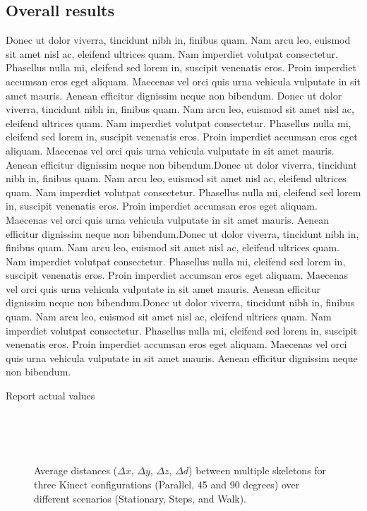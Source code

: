 \documentclass{sigchi}
\begin{document}
\subsection{Overall results}

Donec ut dolor viverra, tincidunt nibh in, finibus quam. Nam arcu leo, euismod sit amet nisl ac, eleifend ultrices quam. Nam imperdiet volutpat consectetur. Phasellus nulla mi, eleifend sed lorem in, suscipit venenatis eros. Proin imperdiet accumsan eros eget aliquam. Maecenas vel orci quis urna vehicula vulputate in sit amet mauris. Aenean efficitur dignissim neque non bibendum.
Donec ut dolor viverra, tincidunt nibh in, finibus quam. Nam arcu leo, euismod sit amet nisl ac, eleifend ultrices quam. Nam imperdiet volutpat consectetur. Phasellus nulla mi, eleifend sed lorem in, suscipit venenatis eros. Proin imperdiet accumsan eros eget aliquam. Maecenas vel orci quis urna vehicula vulputate in sit amet mauris. Aenean efficitur dignissim neque non bibendum.Donec ut dolor viverra, tincidunt nibh in, finibus quam. Nam arcu leo, euismod sit amet nisl ac, eleifend ultrices quam. Nam imperdiet volutpat consectetur. Phasellus nulla mi, eleifend sed lorem in, suscipit venenatis eros. Proin imperdiet accumsan eros eget aliquam. Maecenas vel orci quis urna vehicula vulputate in sit amet mauris. Aenean efficitur dignissim neque non bibendum.Donec ut dolor viverra, tincidunt nibh in, finibus quam. Nam arcu leo, euismod sit amet nisl ac, eleifend ultrices quam. Nam imperdiet volutpat consectetur. Phasellus nulla mi, eleifend sed lorem in, suscipit venenatis eros. Proin imperdiet accumsan eros eget aliquam. Maecenas vel orci quis urna vehicula vulputate in sit amet mauris. Aenean efficitur dignissim neque non bibendum.Donec ut dolor viverra, tincidunt nibh in, finibus quam. Nam arcu leo, euismod sit amet nisl ac, eleifend ultrices quam. Nam imperdiet volutpat consectetur. Phasellus nulla mi, eleifend sed lorem in, suscipit venenatis eros. Proin imperdiet accumsan eros eget aliquam. Maecenas vel orci quis urna vehicula vulputate in sit amet mauris. Aenean efficitur dignissim neque non bibendum.

Report actual values


\begin{figure}
  \centering

   \\
   \\
   \\

  \caption{Average distances ($\Delta x$, $\Delta y$, $\Delta z$, $\Delta d$) between multiple skeletons
    for three Kinect configurations (Parallel, 45 and 90 degrees) over different scenarios (Stationary, Steps, and Walk).}

  \label{fig:results_steps}
\end{figure}
\end{document}

